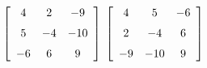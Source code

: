 {$\left[ \begin {array}{ccc} 4&2&-9\\\noalign{\medskip}5&-4&-10
\\\noalign{\medskip}-6&6&9\end {array} \right] $}
{$\left[ \begin {array}{ccc} 4&5&-6\\\noalign{\medskip}2&-4&6
\\\noalign{\medskip}-9&-10&9\end {array} \right]$ 
}
